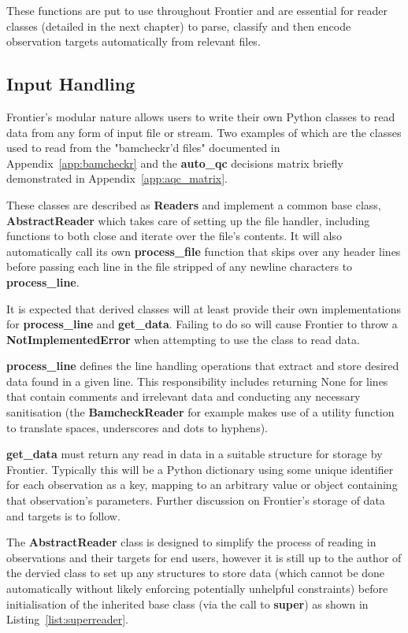 These functions are put to use throughout Frontier and are essential for reader
classes (detailed in the next chapter) to parse, classify and then encode
observation targets automatically from relevant files.


\subsection{Input Handling}
\label{sec:frontier-input}

Frontier's modular nature allows users to write their own Python classes to read
data from any form of input file or stream. Two examples of which are the
classes used to read from the "bamcheckr'd files" documented in
Appendix~\ref{app:bamcheckr} and the \textbf{auto\_qc} decisions matrix briefly
demonstrated in Appendix~\ref{app:aqc_matrix}.

These classes are described as \textbf{Readers} and implement a common base
class, \textbf{AbstractReader} which takes care of
setting up the file handler, including functions to both close and iterate over
the file's contents. It will also automatically call its own
\textbf{process\_file} function that skips over any header lines before passing
each line in the file stripped of any newline characters to \textbf{process\_line}.

It is expected that derived classes will at least provide their own
implementations for \textbf{process\_line} and \textbf{get\_data}. Failing to do
so will cause Frontier to throw a \textbf{NotImplementedError} when attempting
to use the class to read data.

\textbf{process\_line} defines the line handling operations that extract and store
desired data found in a given line. This responsibility includes returning None
for lines that contain comments and irrelevant data and conducting any necessary
sanitisation (the \textbf{BamcheckReader} for example makes use of a utility
function to translate spaces, underscores and dots to hyphens).

\textbf{get\_data} must return any read in data in a suitable structure for
storage by Frontier. Typically this will be a Python dictionary using some
unique identifier for each observation as a key, mapping to an arbitrary value
or object containing that observation's parameters. Further discussion on
Frontier's storage of data and targets is to follow.

The \textbf{AbstractReader} class is designed to simplify the process of reading
in observations and their targets for end users, however it is still up to the
author of the dervied class to set up any structures to store data (which cannot
be done automatically without likely enforcing potentially unhelpful
constraints) before initialisation of the inherited base class (via the call to
\textbf{super}) as shown in Listing~\ref{list:superreader}.

